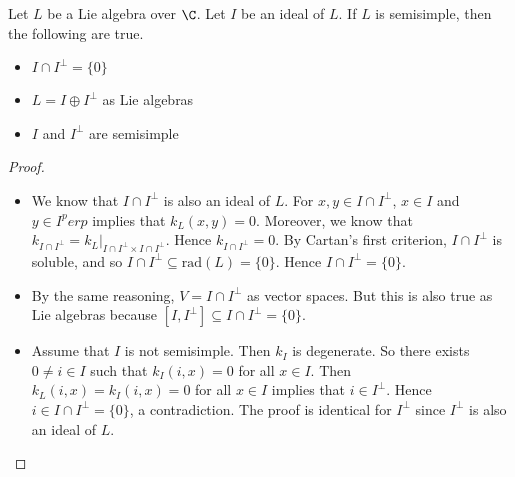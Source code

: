\documentclass[a4paper]{article}
\begin{document}
\begin{lmm}{}{} Let $L$ be a Lie algebra over $\C$. Let $I$ be an ideal of $L$. If $L$ is semisimple, then the following are true. 
\begin{itemize}
\item $I\cap I^\perp=\{0\}$
\item $L=I\oplus I^\perp$ as Lie algebras
\item $I$ and $I^\perp$ are semisimple
\end{itemize} \tcbline
\begin{proof}~\\
\begin{itemize}
\item We know that $I\cap I^\perp$ is also an ideal of $L$. For $x,y\in I\cap I^\perp$, $x\in I$ and $y\in I^perp$ implies that $k_L(x,y)=0$. Moreover, we know that $k_{I\cap I^\perp}=k_L|_{I\cap I^\perp\times I\cap I^\perp}$. Hence $k_{I\cap I^\perp}=0$. By Cartan's first criterion, $I\cap I^\perp$ is soluble, and so $I\cap I^\perp\subseteq\text{rad}(L)=\{0\}$. Hence $I\cap I^\perp=\{0\}$. 
\item By the same reasoning, $V=I\cap I^\perp$ as vector spaces. But this is also true as Lie algebras because $[I,I^\perp]\subseteq I\cap I^\perp=\{0\}$. 
\item Assume that $I$ is not semisimple. Then $k_I$ is degenerate. So there exists $0\neq i\in I$ such that $k_I(i,x)=0$ for all $x\in I$. Then $k_L(i,x)=k_I(i,x)=0$ for all $x\in I$ implies that $i\in I^\perp$. Hence $i\in I\cap I^\perp=\{0\}$, a contradiction. The proof is identical for $I^\perp$ since $I^\perp$ is also an ideal of $L$. 
\end{itemize}
\end{proof}
\end{lmm}
\end{document}
